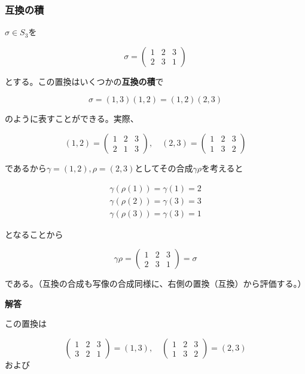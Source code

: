 \documentclass[dvipdfmx,autodetect-engine]{jsarticle}
\theoremstyle{definition}
\begin{document}
\subsubsection{互換の積}

$\sigma \in S_3$を

$$
\sigma = \begin{pmatrix}
1 & 2 & 3 \\
2 & 3 & 1
\end{pmatrix}
$$

とする。この置換はいくつかの{\bf 互換の積}で

$$
\sigma = (1, 3)(1, 2) = (1,2)(2,3)
$$

のように表すことができる。実際、


$$
(1, 2) = \begin{pmatrix}
1 & 2 & 3\\
2 & 1 & 3
\end{pmatrix}, \quad 
(2, 3) = \begin{pmatrix}
1 & 2 & 3 \\
1 & 3 & 2
\end{pmatrix}
$$

であるから$\gamma = (1, 2), \rho = (2, 3)$としてその合成$\gamma\rho$を考えると

\begin{eqnarray*}
\gamma(\rho(1)) = \gamma(1) = 2 \\
\gamma(\rho(2)) = \gamma(3) = 3 \\
\gamma(\rho(3)) = \gamma(3) = 1
\end{eqnarray*}

となることから

$$
\gamma\rho = \begin{pmatrix}
1 & 2 & 3 \\
2 & 3 & 1
\end{pmatrix} = \sigma
$$

である。（互換の合成も写像の合成同様に、右側の置換（互換）から評価する。）


{\bf 解答}

この置換は

$$
\begin{pmatrix}
1 & 2 & 3 \\
3 & 2 & 1
\end{pmatrix} = (1, 3),\quad 
\begin{pmatrix}
1 & 2 & 3 \\
1 & 3 & 2
\end{pmatrix} = (2, 3)
$$
および
\end{document}
